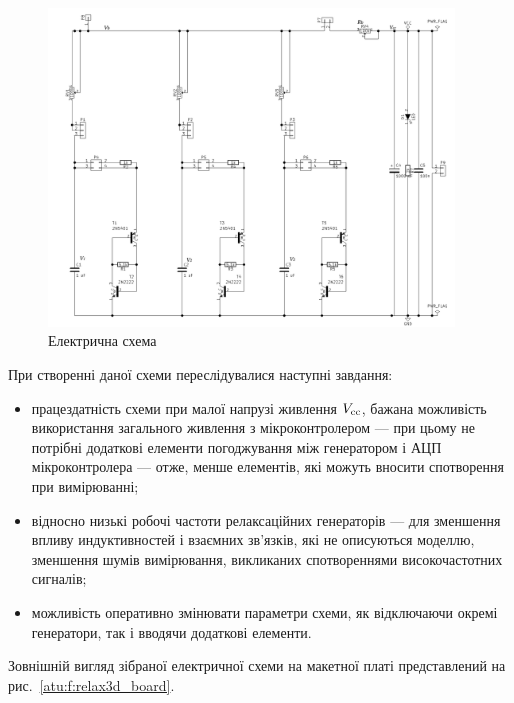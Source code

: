 \begin{figure}[htb!]
  \centerline{\includegraphics[width=0.96\textwidth]{p/relax3d_schem.png} }
\caption{Електрична схема \RelaxBjtIi}
\label{atu:f:relax3d_schem}
\end{figure}

При створенні даної схеми переслідувалися наступні завдання:
\begin{itemize}


  \item
    працездатність схеми при малої напрузі живлення
    $ V _\mathrm{cc} $, бажана можливість використання загального живлення
    з мікроконтролером --- при цьому не потрібні додаткові
    елементи погоджування між генератором і АЦП мікроконтролера
    --- отже, менше елементів, які можуть вносити спотворення при
    вимірюванні;

  \item
    відносно низькі робочі частоти релаксаційних генераторів ---
    для зменшення впливу индуктивностей і взаємних зв'язків, які
    не описуються моделлю, зменшення шумів вимірювання, викликаних
    спотвореннями високочастотних сигналів;

  \item
    можливість оперативно змінювати параметри схеми, як відключаючи
    окремі генератори, так і вводячи додаткові елементи.

\end{itemize}

Зовнішній вигляд зібраної електричної схеми на макетної платі
представлений на рис.~\ref{atu:f:relax3d_board}.

